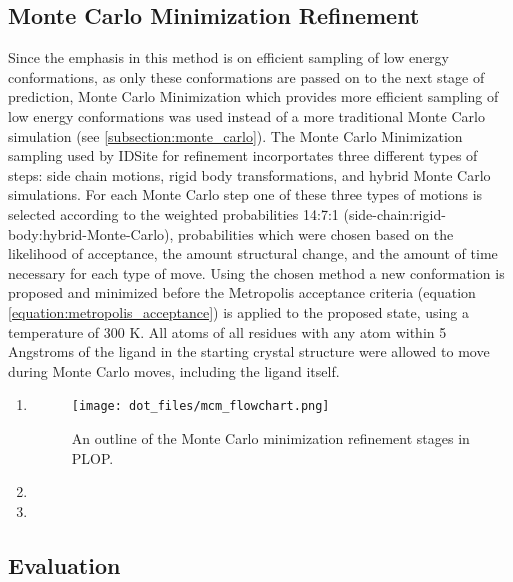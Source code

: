 \subsection{Monte Carlo Minimization Refinement}
\label{subsection:p450/mcm}
Since the emphasis in this method is on efficient sampling of low energy conformations, as only these conformations are passed on to the next stage of prediction, Monte Carlo Minimization which provides more efficient sampling of low energy conformations was used instead of a more traditional Monte Carlo simulation (see \ref{subsection:monte_carlo}).
The Monte Carlo Minimization sampling used by IDSite for refinement incorportates three different types of steps: side chain motions, rigid body transformations, and hybrid Monte Carlo simulations.
For each Monte Carlo step one of these three types of motions is selected according to the weighted probabilities 14:7:1 (side-chain:rigid-body:hybrid-Monte-Carlo), probabilities which were chosen based on the likelihood of acceptance, the amount structural change, and the amount of time necessary for each type of move.
Using the chosen method a new conformation is proposed and minimized before the Metropolis acceptance criteria (equation \ref{equation:metropolis_acceptance}) is applied to the proposed state, using a temperature of 300 K.
All atoms of all residues with any atom within 5 Angstroms of the ligand in the starting crystal structure were allowed to move during Monte Carlo moves, including the ligand itself.

\begin{enumerate}
\item 
\begin{figure}[h]
\centering
\texttt{[image: dot\_files/mcm\_flowchart.png]}
\caption{An outline of the Monte Carlo minimization refinement stages in PLOP.}
\label{fig:mcm_flowchart}
\end{figure}
\item 
\item 
\end{enumerate}

\subsection{Evaluation}
\label{subsection:p450/evaluation}

